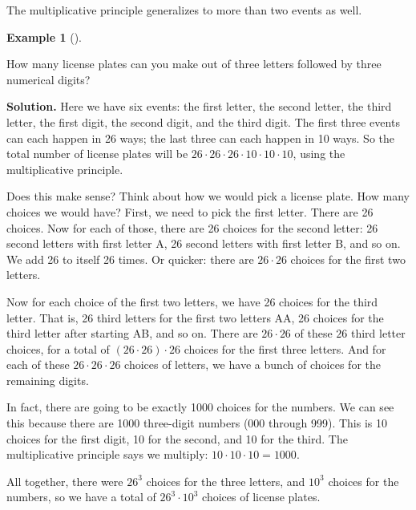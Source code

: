 \documentclass[10pt,]{book}
\theoremstyle{plain}
\theoremstyle{definition}
\newtheorem{example}[theorem]{Example}
\theoremstyle{definition}
\theoremstyle{definition}
\numberwithin{equation}{chapter}
\begin{document}
    The multiplicative principle generalizes to more than two events as well.
\begin{example}[]\label{example-26}

        How many license plates can you make out of three letters followed by three numerical digits?
\par\medskip\noindent%
\textbf{Solution.}\quad
        Here we have six events: the first letter, the second letter, the third letter, the first digit, the second digit, and the third digit. The first three events can each happen in 26 ways; the last three can each happen in 10 ways. So the total number of license plates will be \(26\cdot 26\cdot 26 \cdot 10 \cdot 10 \cdot 10\), using the multiplicative principle.
\par

        Does this make sense? Think about how we would pick a license plate. How many choices we would have? First, we need to pick the first letter. There are 26 choices. Now for each of those, there are 26 choices for the second letter: 26 second letters with first letter A, 26 second letters with first letter B, and so on. We add 26 to itself 26 times. Or quicker: there are \(26 \cdot 26\) choices for the first two letters.
\par

        Now for each choice of the first two letters, we have 26 choices for the third letter. That is, 26 third letters for the first two letters AA, 26 choices for the third letter after starting AB, and so on. There are \(26 \cdot 26\) of these \(26\) third letter choices, for a total of \((26\cdot26)\cdot 26\) choices for the first three letters. And for each of these \(26\cdot26\cdot26\) choices of letters, we have a bunch of choices for the remaining digits.
\par

        In fact, there are going to be exactly 1000 choices for the numbers. We can see this because there are 1000 three-digit numbers (000 through 999). This is 10 choices for the first digit, 10 for the second, and 10 for the third. The multiplicative principle says we multiply: \(10\cdot 10 \cdot 10 = 1000\).
\par

        All together, there were \(26^3\) choices for the three letters, and \(10^3\) choices for the numbers, so we have a total of \(26^3 \cdot 10^3\) choices of license plates.
\end{example}
\par
\end{document}
